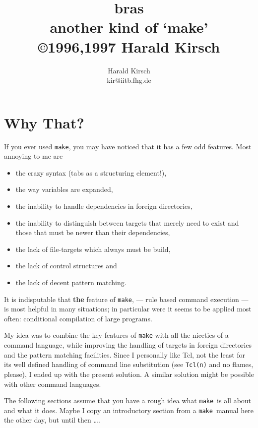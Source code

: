 \documentclass[12pt]{article}
\title{\textsf{bras}\\
another kind of `make'\\
\small \copyright 1996,1997 Harald Kirsch}
\author{\relax
Harald Kirsch\\
kir@iitb.fhg.de}
\newcommand{\make}{\texttt{make}}
\begin{document}
\maketitle
\tableofcontents

\section{Why That?}
If you ever used \texttt{make}, you may have noticed that it has a few
odd features. Most annoying to me are
\begin{itemize}
\item the crazy syntax (tabs as a structuring element!),
\item the way variables are expanded,
\item the inability to handle dependencies in foreign directories,
\item the inability to distinguish between targets that merely need to
  exist and those that must be newer than their dependencies,
\item the lack of file-targets which always must be build,
\item the lack of control structures and 
\item the lack of decent pattern matching.
\end{itemize}

It is indisputable that \textbf{the} feature of \texttt{make}, ---
rule based command execution --- is most helpful in many situations;
in particular were it seems to be applied most often:
conditional compilation of large programs.

My idea was to combine the key features of \texttt{make} with all the
niceties of a command language, while improving the handling of
targets in foreign directories and the pattern matching
facilities. Since I personally like Tcl, not the least for its well
defined handling of command line substitution (see \texttt{Tcl(n)} and
no flames, please), I ended up with the present solution. A similar
solution might be possible with other command languages.

The following sections assume that you have a rough idea what \make\
is all about and what it does. Maybe I copy an introductory
section from a \make\ manual here the other day, but until then
\ldots.

\end{document}
